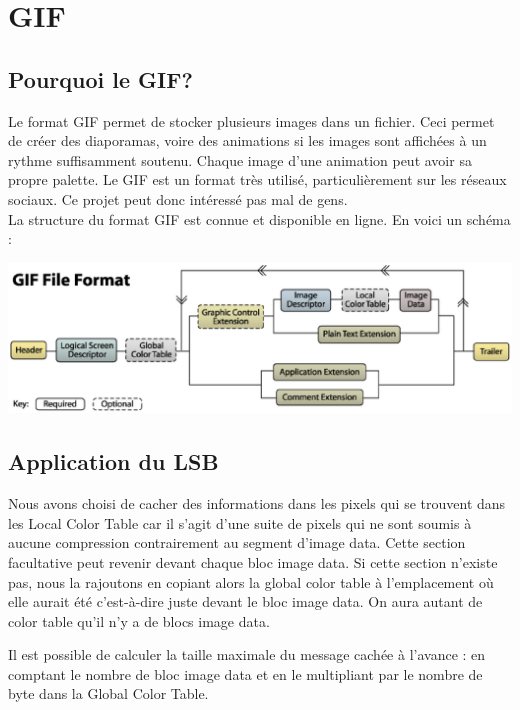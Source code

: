 \section{GIF}

\subsection{Pourquoi le GIF?}
Le format GIF permet de stocker plusieurs images dans un fichier. 
Ceci permet de créer des diaporamas, voire des animations si les images sont affichées à un rythme suffisamment soutenu. 
Chaque image d'une animation peut avoir sa propre palette.
Le GIF est un format très utilisé, particulièrement sur les réseaux sociaux. 
Ce projet peut donc intéressé pas mal de gens.\\
La structure du format GIF est connue et disponible en ligne. En voici un schéma :

\vspace{1.5cm}

\includegraphics[width=15cm]{gif_structure.eps}


\newpage
\subsection{Application du LSB}
Nous avons choisi de cacher des informations dans les pixels qui se trouvent dans les Local Color Table car il s'agit d'une
suite de pixels qui ne sont soumis à aucune compression contrairement au segment d'image data.
Cette section facultative peut revenir devant chaque bloc image data. Si cette section n'existe pas, nous la rajoutons en copiant
alors la global color table à l'emplacement où elle aurait été c'est-à-dire juste devant le bloc image data.
On aura autant de color table qu'il n'y a de blocs image data.

Il est possible de calculer la taille maximale du message cachée à l'avance : 
en comptant le nombre de bloc image data et en le multipliant par le nombre de byte dans la Global Color Table.

\vspace{1.5cm}

